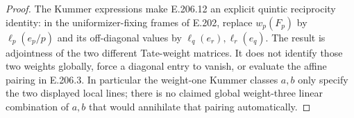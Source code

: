 \begin{proof}
The Kummer expressions make E.206.12 an explicit quintic
reciprocity identity: in the uniformizer-fixing frames of
E.202, replace $w_p(F_p)$ by $\ell_p(e_p/p)$ and its
off-diagonal values by $\ell_q(e_r),\ell_r(e_q)$.
The result is adjointness of the two different Tate-weight
matrices.  It does not identify those two weights globally,
force a diagonal entry to vanish, or evaluate the affine
pairing in E.206.3.  In particular the weight-one Kummer
classes $a,b$ only specify the two displayed local lines;
there is no claimed global weight-three linear combination
of $a,b$ that would annihilate that pairing automatically.
\end{proof}
